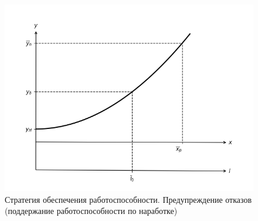 \documentclass[../nirs.tex]{subfiles}
\begin{document}
\begin{figure}[H]
\centering
\includegraphics[keepaspectratio,width=\textwidth]{./images/pdf.c.png}
\caption{Стратегия обеспечения работоспособности. Предупреждение отказов
    (поддержание работоспособности по наработке)}
\label{fig:pdf.c}
\end{figure}
\end{document}
